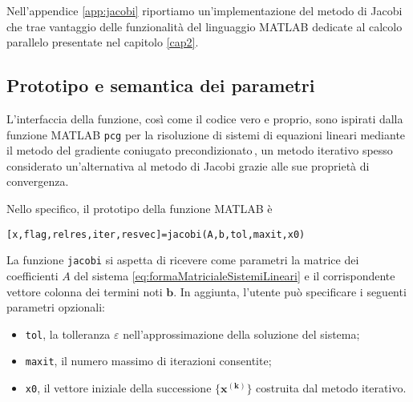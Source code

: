 Nell'appendice \ref{app:jacobi} riportiamo un'implementazione del metodo di Jacobi che trae vantaggio delle funzionalit\`a del linguaggio MATLAB dedicate al 
calcolo parallelo presentate nel capitolo \ref{cap2}.

\subsection{Prototipo e semantica dei parametri}
L'interfaccia della funzione, cos\`i come il codice vero e proprio, sono ispirati dalla funzione MATLAB 
\lstinline|pcg| per la risoluzione di sistemi di equazioni lineari mediante il metodo del gradiente coniugato precondizionato\,\cite{MathWorksPCG}, 
un metodo iterativo spesso considerato un'alternativa al metodo di Jacobi grazie alle sue propriet\`a di convergenza.

Nello specifico, il prototipo della funzione MATLAB \`e
\begin{lstlisting}
[x,flag,relres,iter,resvec]=jacobi(A,b,tol,maxit,x0)
\end{lstlisting}
La funzione \lstinline|jacobi| si aspetta di ricevere come parametri la matrice dei coefficienti $A$ del sistema \eqref{eq:formaMatricialeSistemiLineari} e il corrispondente vettore colonna dei termini noti $\mathbf{b}$.\newline
In aggiunta, l'utente pu\`o specificare i seguenti parametri opzionali:
\begin{itemize}
    \item \lstinline|tol|, la tolleranza $\varepsilon$ nell'approssimazione della soluzione del sistema;
    \item \lstinline|maxit|, il numero massimo di iterazioni consentite;
    \item \lstinline|x0|, il vettore iniziale della successione $\mathbf{\{x^{(k)}\}}$ costruita dal metodo iterativo.
\end{itemize}

